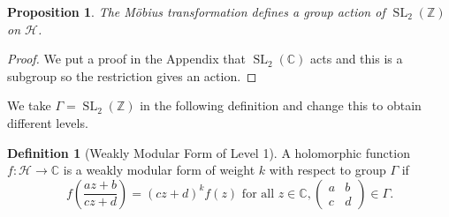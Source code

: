 \documentclass{article}
\newtheorem{proposition}{Proposition}[section]
\theoremstyle{definition}
\newtheorem{definition}{Definition}[section]
\theoremstyle{definition}
\theoremstyle{definition}
\newcommand{\SLZ}{\operatorname{SL}_2(\mathbb{Z})}
\newcommand{\SL}{\operatorname{SL}}
\newcommand{\C}{\mathbb{C}}
\newcommand{\Mabcd}{\begin{pmatrix} a&b\\c&d \end{pmatrix}}
\begin{document}
\begin{proposition}
    The Möbius transformation defines a group action of $\SLZ$ on $\mathcal{H}$.
\end{proposition}
\begin{proof} We put a proof in the Appendix that $\SL_2(\C)$ acts and this is a subgroup so the restriction gives an action.


\end{proof}

We take $\Gamma=\SLZ$ in the following definition and change this to obtain different levels.
\begin{definition} [Weakly Modular Form of Level 1]

A holomorphic function $f:\mathcal{H}\rightarrow\mathbb{C}$ is a weakly modular form of weight $k$ with respect to group $\Gamma$ if
$$f\left(\frac{az + b}{cz + d}\right)=(cz+d)^kf(z)\text{ for all }z\in \mathbb{C}, \Mabcd\in\Gamma.$$
\end{definition}
\end{document}
